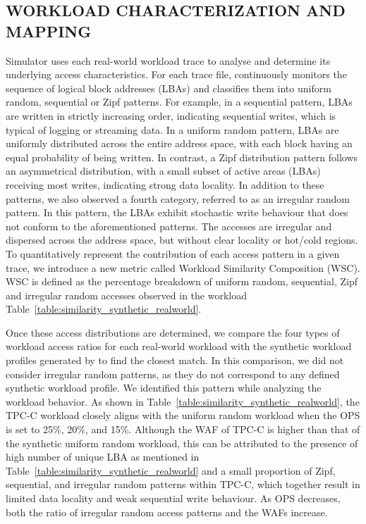 \documentclass{ieeeaccess}
\begin{document}
\subsection{WORKLOAD CHARACTERIZATION AND MAPPING}
\label{subsec:mapping}
Simulator \eyanassdsim uses each real-world workload trace to analyse and determine its underlying access characteristics. For each trace file, \eyanassdsim continuously monitors the sequence of logical block addresses (LBAs) and classifies them into uniform random, sequential or Zipf patterns. For example, in a sequential pattern, LBAs are written in strictly increasing order, indicating sequential writes, which is typical of logging or streaming data. In a uniform random pattern, LBAs are uniformly distributed across the entire address space, with each block having an equal probability of being written. In contrast, a Zipf distribution pattern follows an asymmetrical distribution, with a small subset of active areas (LBAs) receiving most writes, indicating strong data locality.
In addition to these patterns, we also observed a fourth category, referred to as an irregular random pattern. In this pattern, the LBAs exhibit stochastic write behaviour that does not conform to the aforementioned patterns. The accesses are irregular and dispersed across the address space, but without clear locality or hot\slash cold regions\cite{hot-cold}.
To quantitatively represent the contribution of each access pattern in a given trace, we introduce a new metric called Workload Similarity Composition (WSC). 
WSC is defined as the percentage breakdown of uniform random, sequential, Zipf and irregular random accesses observed in the workload Table~\ref{table:similarity_synthetic_realworld}.

Once these access distributions are determined, we compare the four types of workload access ratios for each real-world workload with the synthetic workload profiles generated by \eyanassdsim to find the closest match. 
In this comparison, we did not consider irregular random patterns, as they do not correspond to any defined synthetic workload profile. We identified this pattern while analyzing the workload behavior. As shown in Table~\ref{table:similarity_synthetic_realworld}, the TPC-C workload closely aligns with the uniform random workload when the OPS is set to 25\%, 20\%, and 15\%. Although the WAF of TPC-C is higher than that of the synthetic uniform random workload, this can be attributed to the presence of high number of unique LBA as mentioned in Table~\ref{table:similarity_synthetic_realworld} and a small proportion of Zipf, sequential, and irregular random patterns within TPC-C, which together result in limited data locality and weak sequential write behaviour. As OPS decreases, both the ratio of irregular random access patterns and the WAFs increase. 
\end{document}
